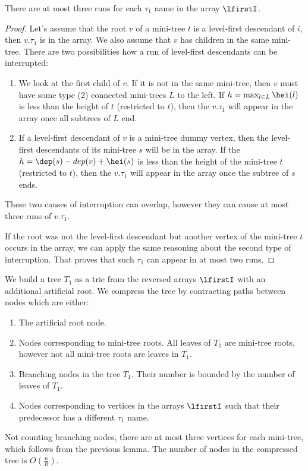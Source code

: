 \begin{lemma}\label{l:level-first-3}
	There are at most three runs for each $\tau_1$ name in the array $\lfirstI$.
\end{lemma}
\begin{proof}
	Let's assume that the root $v$ of a mini-tree $t$ is a level-first descendant of $i$, then $v.\tau_1$ is in the array.
	We also assume that $v$ has children in the same mini-tree.
	There are two possibilities how a run of level-first descendants can be interrupted:
	\begin{enumerate}
		\item We look at the first child of $v$.
		If it is not in the same mini-tree, then $v$ must have some type (2) connected mini-trees $L$ to the left.
		If $h = \max_{l \in L} \hei(l)$ is less than the height of $t$ (restricted to $t$), then the $v.\tau_1$ will appear in the array once all subtrees of $L$ end.
		
		\item If a level-first descendant of $v$ is a mini-tree dummy vertex, then the level-first descendants of its mini-tree $s$ will be in the array.
		If the $h = \dep(s) - dep(v) + \hei(s)$ is less than the height of the mini-tree $t$ (restricted to $t$), then the $v.\tau_1$ will appear in the array once the subtree of $s$ ends.
	\end{enumerate}
	These two causes of interruption can overlap, however they can cause at most three runs of $v.\tau_1$.
	
	If the root was not the level-first descendant but another vertex of the mini-tree $t$ occurs in the array, we can apply the same reasoning about the second type of interruption.
	That proves that such $\tau_1$ can appear in at most two runs.
\end{proof}

\bigbreak

We build a tree $T_1$ as a trie from the reversed arrays $\lfirstI$ with an additional artificial root.
We compress the tree by contracting paths between nodes which are either:
\begin{enumerate}
	\item The artificial root node.
	\item Nodes corresponding to mini-tree roots.
	All leaves of $T_1$ are mini-tree roots, however not all mini-tree roots are leaves in $T_1$.
	\item Branching nodes in the tree $T_1$.
	Their number is bounded by the number of leaves of $T_1$.
	\item Nodes corresponding to vertices in the arrays $\lfirstI$ such that their predecessor has a different $\tau_1$ name.
\end{enumerate}
Not counting branching nodes, there are at most three vertices for each mini-tree, which follows from the previous lemma.
The number of nodes in the compressed tree is $O\left(\frac{n}{B}\right)$.

